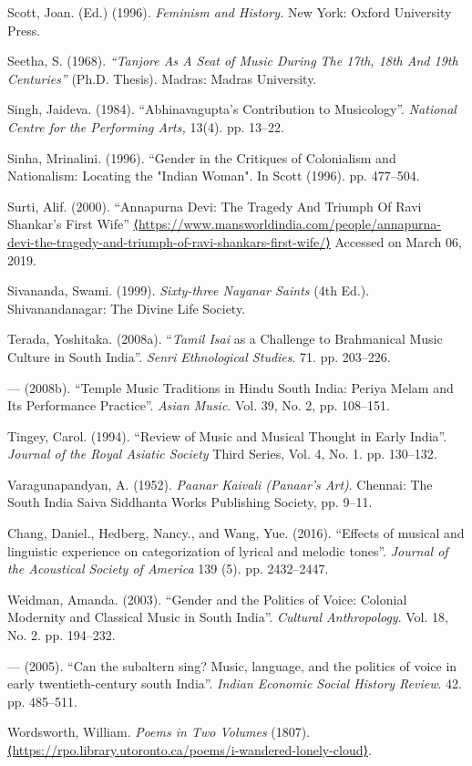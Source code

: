 \begin{thebibliography}{99}
  Scott, Joan. (Ed.) (1996).\textit{ Feminism and History. }New York: Oxford University Press.

  Seetha, S. (1968). \textit{“Tanjore As A Seat of Music During The 17th, 18th And 19th Centuries” }(Ph.D. Thesis). Madras: Madras University.

  Singh, Jaideva. (1984). “Abhinavagupta's Contribution to Musicology”. \textit{National Centre for the Performing Arts, }13(4). pp. 13--22.

  Sinha, Mrinalini. (1996). “Gender in the Critiques of Colonialism and Nationalism: Locating the "Indian Woman". In Scott (1996). pp. 477--504.

  Surti, Alif. (2000). “Annapurna Devi: The Tragedy And Triumph Of Ravi Shankar’s First Wife” \url{⟨https://www.mansworldindia.com/people/annapurna-devi-the-tragedy-and-triumph-of-ravi-shankars-first-wife/⟩} Accessed on March 06, 2019.

  Sivananda, Swami. (1999). \textit{Sixty-three Nayanar Saints} (4th Ed.). Shivanandanagar: The Divine Life Society.

  Terada, Yoshitaka. (2008a). “\textit{Tamil Isai} as a Challenge to Brahmanical Music Culture in South India”. \textit{Senri Ethnological Studies}. 71. pp. 203--226.

  — (2008b). “Temple Music Traditions in Hindu South India: Periya Melam and Its Performance Practice”. \textit{Asian Music}. Vol. 39, No. 2, pp. 108--151.

  Tingey, Carol. (1994). “Review of Music and Musical Thought in Early India”. \textit{Journal of the Royal Asiatic Society} Third Series, Vol. 4, No. 1. pp. 130--132.

  Varagunapandyan, A. (1952). \textit{Paanar Kaivali (Panaar's Art)}. Chennai: The South India Saiva Siddhanta Works Publishing Society, pp. 9--11.

  Chang, Daniel., Hedberg, Nancy., and Wang, Yue. (2016). “Effects of musical and linguistic experience on categorization of lyrical and melodic tones”. \textit{Journal of the Acoustical Society of America} 139 (5). pp. 2432--2447.

  Weidman, Amanda. (2003). “Gender and the Politics of Voice: Colonial Modernity and Classical Music in South India”. \textit{Cultural Anthropology}. Vol. 18, No. 2. pp. 194--232.

  — (2005). “Can the subaltern sing? Music, language, and the politics of voice in early twentieth-century south India”. \textit{Indian Economic Social History Review}. 42. pp. 485--511.

  Wordsworth, William. \textit{Poems in Two Volumes} (1807). \url{⟨https://rpo.library.utoronto.ca/poems/i-wandered-lonely-cloud⟩}.

 \end{thebibliography}

